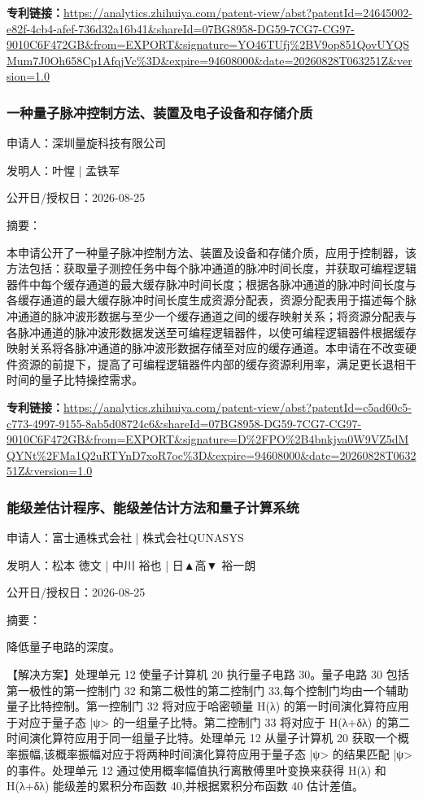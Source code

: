 \documentclass[12pt,a4paper]{ctexart}
\begin{document}
\noindent\textbf{专利链接：}\url{https://analytics.zhihuiya.com/patent-view/abst?patentId=24645002-e82f-4cb4-afef-736d32a16b41&shareId=07BG8958-DG59-7CG7-CG97-9010C6F472GB&from=EXPORT&signature=YO46TUfj%2BV9op851QovUYQSMum7J0Oh658Cp1AfqjVc%3D&expire=94608000&date=20260828T063251Z&version=1.0}

\subsubsection{ 一种量子脉冲控制方法、装置及电子设备和存储介质 }

申请人：深圳量旋科技有限公司

发明人：叶惺 | 孟铁军

公开日/授权日：2026-08-25

摘要：

本申请公开了一种量子脉冲控制方法、装置及设备和存储介质，应用于控制器，该方法包括：获取量子测控任务中每个脉冲通道的脉冲时间长度，并获取可编程逻辑器件中每个缓存通道的最大缓存脉冲时间长度；根据各脉冲通道的脉冲时间长度与各缓存通道的最大缓存脉冲时间长度生成资源分配表，资源分配表用于描述每个脉冲通道的脉冲波形数据与至少一个缓存通道之间的缓存映射关系；将资源分配表与各脉冲通道的脉冲波形数据发送至可编程逻辑器件，以使可编程逻辑器件根据缓存映射关系将各脉冲通道的脉冲波形数据存储至对应的缓存通道。本申请在不改变硬件资源的前提下，提高了可编程逻辑器件内部的缓存资源利用率，满足更长退相干时间的量子比特操控需求。

\noindent\textbf{专利链接：}\url{https://analytics.zhihuiya.com/patent-view/abst?patentId=c5ad60c5-c773-4997-9155-8ab5d08724c6&shareId=07BG8958-DG59-7CG7-CG97-9010C6F472GB&from=EXPORT&signature=D%2FPO%2B4bnkjva0W9VZ5dMQYNt%2FMa1Q2uRTYnD7xoR7oc%3D&expire=94608000&date=20260828T063251Z&version=1.0}

\subsubsection{ 能级差估计程序、能级差估计方法和量子计算系统 }

申请人：富士通株式会社 | 株式会社QUNASYS

发明人：松本 徳文 | 中川 裕也 | 日▲高▼ 裕一朗

公开日/授权日：2026-08-25

摘要：

降低量子电路的深度。 

 【解决方案】处理单元 12 使量子计算机 20 执行量子电路 30。量子电路 30 包括第一极性的第一控制门 32 和第二极性的第二控制门 33,每个控制门均由一个辅助量子比特控制。第一控制门 32 将对应于哈密顿量 H(λ) 的第一时间演化算符应用于对应于量子态 |ψ> 的一组量子比特。第二控制门 33 将对应于 H(λ+δλ) 的第二时间演化算符应用于同一组量子比特。处理单元 12 从量子计算机 20 获取一个概率振幅,该概率振幅对应于将两种时间演化算符应用于量子态 |ψ> 的结果匹配 |ψ> 的事件。处理单元 12 通过使用概率幅值执行离散傅里叶变换来获得 H(λ) 和 H(λ+δλ) 能级差的累积分布函数 40,并根据累积分布函数 40 估计差值。
\end{document}
